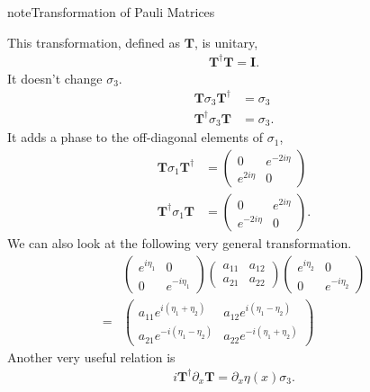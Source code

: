 \documentclass[letterpaper,12pt,english]{sphinxmanual}
\begin{document}
\begin{sphinxadmonition}{note}{Transformation of Pauli Matrices}

This transformation, defined as \(\mathbf{T}\), is unitary,
\begin{equation*}
\begin{split}\mathbf{T}^\dagger \mathbf{T} = \mathbf{I}.\end{split}
\end{equation*}
It doesn't change \(\sigma_3\).
\begin{equation*}
\begin{split}\mathbf{T} \sigma_3 \mathbf{T}^\dagger &= \sigma_3\\
\mathbf{T}^\dagger \sigma_3 \mathbf{T} &= \sigma_3.\end{split}
\end{equation*}
It adds a phase to the off-diagonal elements of \(\sigma_1\),
\begin{equation*}
\begin{split}\mathbf{T} \sigma_1 \mathbf{T}^\dagger &= \begin{pmatrix} 0 & e^{-2i\eta} \\ e^{2 i\eta } & 0 \end{pmatrix} \\
\mathbf{T}^\dagger \sigma_1 \mathbf{T} &= \begin{pmatrix} 0 & e^{2i\eta} \\ e^{-2 i\eta } & 0 \end{pmatrix}.\end{split}
\end{equation*}
We can also look at the following very general transformation.
\begin{equation*}
\begin{split}& \begin{pmatrix} e^{i\eta_1} & 0 \\ 0 & e^{-i\eta_1}\end{pmatrix} \begin{pmatrix} a_{11} & a_{12} \\ a_{21} & a_{22}\end{pmatrix}  \begin{pmatrix} e^{i\eta_2} & 0 \\ 0 & e^{-i\eta_2}\end{pmatrix} \\
= & \begin{pmatrix} a_{11} e^{i(\eta_1+\eta_2)} & a_{12} e^{i(\eta_1 - \eta_2)} \\ a_{21} e^{-i(\eta_1-\eta_2)} & a_{22} e^{-i(\eta_1+\eta_2)}  \end{pmatrix}\end{split}
\end{equation*}
Another very useful relation is
\begin{equation*}
\begin{split}i\mathbf{T}^{\dagger} \partial_x \mathbf{T} = \partial_x \eta(x) \sigma_3.\end{split}
\end{equation*}\end{sphinxadmonition}
\end{document}
